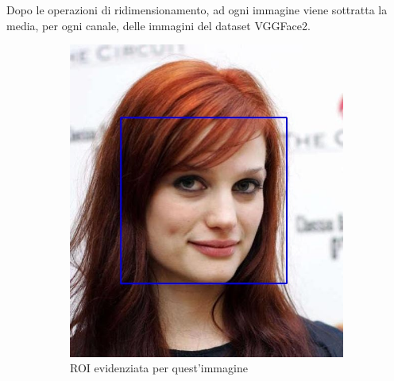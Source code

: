 Dopo le operazioni di ridimensionamento, ad ogni immagine viene sottratta la media, per ogni canale, delle immagini del dataset VGGFace2.

\begin{figure}[ht]
\centering
\begin{subfigure}{0.3\textwidth}
\includegraphics[width=\textwidth]{./Images/detection.jpg}
\caption{ROI evidenziata per quest'immagine}
\label{sfig:detection}
\end{subfigure}
\hspace{0.1\textwidth}
\begin{subfigure}{0.3\textwidth}

\end{subfigure}
\end{figure}
